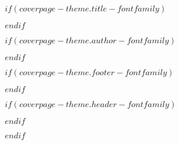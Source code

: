 $if(coverpage-theme.title-fontfamily)$
\usepackage{fontspec}
$endif$

$if(coverpage-theme.author-fontfamily)$
\usepackage{fontspec}
$endif$

$if(coverpage-theme.footer-fontfamily)$
\usepackage{fontspec}
$endif$

$if(coverpage-theme.header-fontfamily)$
\usepackage{fontspec}
$endif$

$endif$
